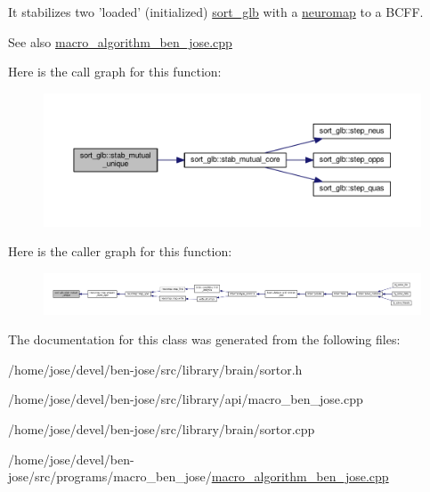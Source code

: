 It stabilizes two 'loaded' (initialized) \hyperlink{classsort__glb}{sort\+\_\+glb} with a \hyperlink{classneuromap}{neuromap} to a B\+C\+F\+F. 

\begin{DoxySeeAlso}{See also}
\hyperlink{macro__algorithm__ben__jose_8cpp}{macro\+\_\+algorithm\+\_\+ben\+\_\+jose.\+cpp} 
\end{DoxySeeAlso}


Here is the call graph for this function\+:\nopagebreak
\begin{figure}[H]
\begin{center}
\leavevmode
\includegraphics[width=350pt]{d7/dec/classsort__glb_abcd6c73d28df5efcf002c2aed63ccd92_cgraph}
\end{center}
\end{figure}




Here is the caller graph for this function\+:\nopagebreak
\begin{figure}[H]
\begin{center}
\leavevmode
\includegraphics[width=350pt]{d7/dec/classsort__glb_abcd6c73d28df5efcf002c2aed63ccd92_icgraph}
\end{center}
\end{figure}




The documentation for this class was generated from the following files\+:\begin{DoxyCompactItemize}
\item 
/home/jose/devel/ben-\/jose/src/library/brain/sortor.\+h\item 
/home/jose/devel/ben-\/jose/src/library/api/macro\+\_\+ben\+\_\+jose.\+cpp\item 
/home/jose/devel/ben-\/jose/src/library/brain/sortor.\+cpp\item 
/home/jose/devel/ben-\/jose/src/programs/macro\+\_\+ben\+\_\+jose/\hyperlink{macro__algorithm__ben__jose_8cpp}{macro\+\_\+algorithm\+\_\+ben\+\_\+jose.\+cpp}\end{DoxyCompactItemize}
